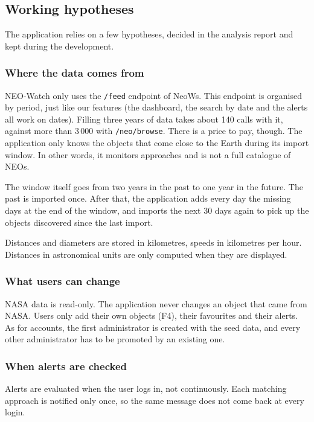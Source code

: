 \subsection{Working hypotheses}

The application relies on a few hypotheses, decided in the analysis report and kept during
the development.

\subsubsection{Where the data comes from}

NEO-Watch only uses the \texttt{/feed} endpoint of NeoWs. This endpoint is organised by period,
just like our features (the dashboard, the search by date and the alerts all work on dates).
Filling three years of data takes about 140 calls with it, against more than 3\,000 with
\texttt{/neo/browse}. There is a price to pay, though. The application only knows the objects
that come close to the Earth during its import window. In other words, it monitors approaches
and is not a full catalogue of NEOs.

The window itself goes from two years in the past to one year in the future. The past is
imported once. After that, the application adds every day the missing days at the end of the
window, and imports the next 30 days again to pick up the objects discovered since the last
import.

Distances and diameters are stored in kilometres, speeds in kilometres per hour. Distances in
astronomical units are only computed when they are displayed.

\subsubsection{What users can change}

NASA data is read-only. The application never changes an object that came from NASA. Users only
add their own objects (F4), their favourites and their alerts. As for accounts, the first
administrator is created with the seed data, and every other administrator has to be promoted by
an existing one.

\subsubsection{When alerts are checked}

Alerts are evaluated when the user logs in, not continuously. Each matching approach is notified
only once, so the same message does not come back at every login.


